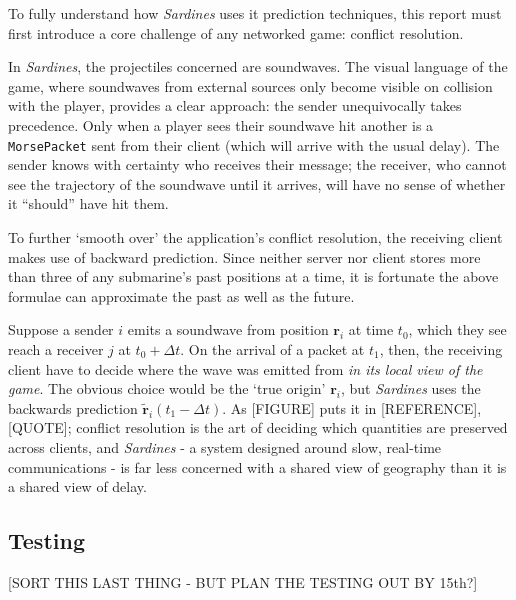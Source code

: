 \documentclass[a4paper, 11pt]{article}
\begin{document}
\begin{flushleft}
\vspace{5pt}\noindent
To fully understand how \textit{Sardines} uses it prediction techniques, this report must first introduce a core challenge of any networked game: conflict resolution.

\vspace{5pt}\noindent
In \textit{Sardines}, the projectiles concerned are soundwaves. The visual language of the game, where soundwaves from external sources only become visible on collision with the player, provides a clear approach: the sender unequivocally takes precedence. Only when a player sees their soundwave hit another is a \texttt{MorsePacket} sent from their client (which will arrive with the usual delay). The sender knows with certainty who receives their message; the receiver, who cannot see the trajectory of the soundwave until it arrives, will have no sense of whether it ``should'' have hit them.

\vspace{5pt}\noindent
To further `smooth over' the application's conflict resolution, the receiving client makes use of backward prediction. Since neither server nor client stores more than three of any submarine's past positions at a time, it is fortunate the above formulae can approximate the past as well as the future.

\vspace{5pt}\noindent
Suppose a sender $i$ emits a soundwave from position $\mathbf{r}_i$ at time $t_0$, which they see reach a receiver $j$ at $t_0+\Delta t$. On the arrival of a packet at $t_1$, then, the receiving client have to decide where the wave was emitted from \textit{in its local view of the game}. The obvious choice would be the `true origin' $\mathbf{r}_i$, but \textit{Sardines} uses the backwards prediction $\mathbf{\tilde{r}}_i(t_1-\Delta t)$. As [FIGURE] puts it in [REFERENCE], [QUOTE]; conflict resolution is the art of deciding which quantities are preserved across clients, and \textit{Sardines} - a system designed around slow, real-time communications - is far less concerned with a shared view of geography than it is a shared view of delay.

\subsection*{Testing}

[SORT THIS LAST THING - BUT PLAN THE TESTING OUT BY 15th?]

%
%
\end{flushleft}
\end{document}
